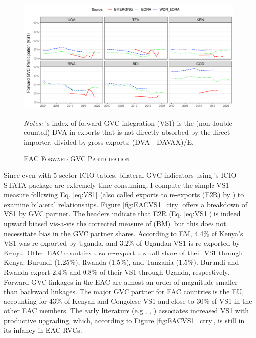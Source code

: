 \documentclass[a4paper]{article}
\begin{document}
\begin{figure}[h!] 
\centering
\caption{\label{fig:EAC_E2R_ag_ts}\textsc{EAC Forward GVC Participation}}
\includegraphics[width=1\textwidth]{"GVCF_shares_ag_ts.pdf"} \\ \raggedright
\scriptsize
\emph{Notes:} \citet{borin2019measuring}'s index of forward GVC integration (VS1) is the (non-double counted) DVA in exports that is not directly absorbed by the direct importer, divided by gross exports: (DVA - DAVAX)/E. 
\end{figure}
\FloatBarrier

Since even with 5-sector ICIO tables, bilateral GVC indicators using \citet{belotti2020icio}'s ICIO STATA package are extremely time-consuming, I compute the simple VS1 measure following Eq. \ref{eq:VS1} (also called exports to re-exports (E2R) by \citet{baldwin2015supply}) to examine bilateral relationships. Figure \ref{fig:EACVS1_ctry} offers a breakdown of VS1 by GVC partner. The headers indicate that E2R (Eq. \ref{eq:VS1}) is indeed upward biased vis-a-vis the corrected measure of \citet{borin2019measuring} (BM), but this does not necessitate bias in the GVC partner shares. According to EM, 4.4\% of Kenya's VS1 was re-exported by Uganda, and 3.2\% of Ugandan VS1 is re-exported by Kenya. Other EAC countries also re-export a small share of their VS1 through Kenya: Burundi (1.25\%), Rwanda (1.5\%), and Tanzania (1.5\%). Burundi and Rwanda export 2.4\% and 0.8\% of their VS1 through Uganda, respectively. Forward GVC linkages in the EAC are almost an order of magnitude smaller than backward linkages. The major GVC partner for EAC countries is the EU, accounting for 43\% of Kenyan and Congolese VS1 and close to 30\% of VS1 in the other EAC members. The early literature (e.g., \citet{foster2015global}, \citet{Kummritz20161}) associates increased VS1 with productive upgrading, which, according to Figure \ref{fig:EACVS1_ctry}, is still in its infancy in EAC RVCs. \newline
\end{document}
